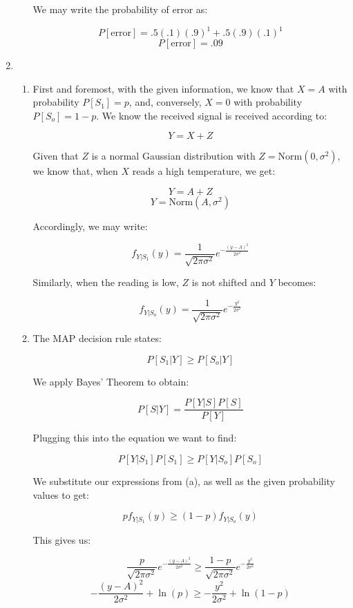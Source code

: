 \begin{enumerate}
\begin{enumerate}
        We may write the probability of error as:

        $$P[\text{error}]=.5(.1)(.9)^1+.5(.9)(.1)^1$$
        $$\boxed{P[\text{error}]=.09}$$

    \end{enumerate}

  \item

    \begin{enumerate}

      \item First and foremost, with the given information, we know that $X=A$ with probability $P[S_1]=p$, and, conversely, $X=0$ with probability $P[S_o]=1-p$. We know the received signal is received according to:

        $$Y=X+Z$$

        Given that $Z$ is a normal Gaussian distribution with $Z=\text{Norm}(0,\sigma^2)$, we know that, when $X$ reads a high temperature, we get:

        $$Y=A+Z$$
        $$Y=\text{Norm}(A,\sigma^2)$$

        Accordingly, we may write:

        $$\boxed{f_{Y|S_1}(y)=\frac{1}{\sqrt{2\pi\sigma^2}}e^{-\frac{(y-A)^2}{2\sigma^2}}}$$

        Similarly, when the reading is low, $Z$ is not shifted and $Y$ becomes:

        $$\boxed{f_{Y|S_o}(y)=\frac{1}{\sqrt{2\pi\sigma^2}}e^{-\frac{y^2}{2\sigma^2}}}$$

      \item The MAP decision rule states:

        $$P[S_1|Y]\geq P[S_o|Y]$$

        We apply Bayes' Theorem to obtain:

        $$P[S|Y]=\frac{P[Y|S]P[S]}{P[Y]}$$

        Plugging this into the equation we want to find:

        $$P[Y|S_1]P[S_1]\geq P[Y|S_o]P[S_o]$$

        We substitute our expressions from (a), as well as the given probability values to get:

        $$pf_{Y|S_1}(y)\geq (1-p)f_{Y|S_o}(y)$$

        This gives us:

        $$\frac{p}{\sqrt{2\pi\sigma^2}}e^{-\frac{(y-A)^2}{2\sigma^2}}\geq \frac{1-p}{\sqrt{2\pi\sigma^2}}e^{-\frac{y^2}{2\sigma^2}}$$
        $$-\frac{(y-A)^2}{2\sigma^2}+\ln(p)\geq -\frac{y^2}{2\sigma^2}+\ln(1-p)$$


\end{enumerate}
\end{enumerate}
